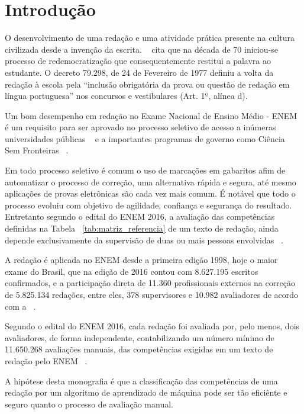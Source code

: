 \chapter{Introdução}\label{CAP:introducao}

\noindent O desenvolvimento de uma redação e uma atividade prática presente na cultura civilizada desde a invenção da escrita. ~\cite{lara:1995} cita que na década de 70 iniciou-se processo de redemocratização que consequentemente restitui a palavra ao estudante. O decreto 79.298, de 24 de Fevereiro de 1977 definiu a volta da redação à escola pela ``inclusão obrigatória da prova ou questão de redação em língua portuguesa'' nos concursos e vestibulares (Art. 1º, alínea d).

Um bom desempenho em redação no Exame Nacional de Ensino Médio - ENEM é um requisito para ser aprovado no processo seletivo de acesso a inúmeras universidades públicas ~\cite{sisu:2017} e a importantes programas de governo como Ciência Sem Fronteiras ~\cite{csf:2017}.

Em todo processo seletivo é comum o uso de marcações em gabaritos afim de automatizar o processo de correção, uma alternativa rápida e segura, até mesmo aplicações de provas eletrônicas são cada vez mais comum. É notável que todo o processo evoluiu com objetivo de agilidade, confiança e segurança do resultado. Entretanto segundo o edital do ENEM 2016, a avaliação das competências definidas na Tabela ~\ref{tab:matriz_referencia} de um texto de redação, ainda depende exclusivamente da supervisão de duas ou mais pessoas envolvidas ~\cite{edital_enem:2016}.

A redação é aplicada no ENEM desde a primeira edição 1998, hoje o maior exame do Brasil, que na edição de 2016 contou com 8.627.195 escritos confirmados, e a participação direta de 11.360 profissionais externos na correção de 5.825.134 redações, entre eles, 378 supervisores e 10.982 avaliadores de acordo com a ~\cite{relatorio_de_gestao:2016}. 

Segundo o edital do ENEM 2016, cada redação foi avaliada por, pelo menos, dois avaliadores, de forma independente, contabilizando um número mínimo de 11.650.268 avaliações manuais, das competências exigidas em um texto de redação pelo ENEM ~\cite{edital_enem:2016}.

A hipótese desta monografia é que a classificação das competências de uma redação por um algoritmo de aprendizado de máquina pode ser tão eficiênte e seguro quanto o processo de avaliação manual.

